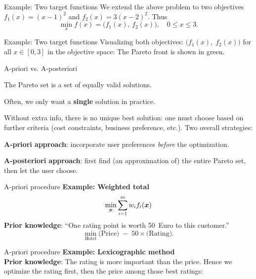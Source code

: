 \documentclass[11pt,compress,t,notes=noshow,xcolor=table]{beamer}
\begin{document}
\begin{framev}{Example: Two target functions}
We extend the above problem to two objectives
$f_1(x) = (x - 1)^2$
and
$f_2(x) = 3(x - 2)^2$. Thus
$$
\min_{x} f(x)
= \bigl(f_1(x),\, f_2(x)\bigr),
\quad 0 \le x \le 3.
$$
\end{framev}


\begin{framev}{Example: Two target functions}
Visualizing both objectives:
$\bigl(f_1(x), \;f_2(x)\bigr)$
for all $x \in [0,3]$ in the objective space:
The Pareto front is shown in green.
\end{framev}


\begin{framei}{A-priori vs. A-posteriori}
\item The Pareto set is a set of equally valid solutions.
\item Often, we only want a \textbf{single} solution in practice.
\item Without extra info, there is no unique best solution: one must choose
based on further criteria (cost constraints, business preference, etc.).
\spacer
Two overall strategies:
\item \textbf{A-priori approach}: incorporate user preferences \emph{before} the optimization.
\item \textbf{A-posteriori approach}: first find (an approximation of) the entire Pareto set,
then let the user choose.
\end{framei}


\begin{framev}{A-priori procedure}
\textbf{Example: Weighted total}
$$ \min_{\bm{x}} \sum_{i=1}^m w_i f_i(\bm{x}) $$
\textbf{Prior knowledge}:
``One rating point is worth 50~Euro to this customer.''
$$
\min_{\text{Hotel}} \text{(Price)} \;-\; 50 \times \text{(Rating)}.
$$
\spacer
{}
\end{framev}


\begin{framev}{A-priori procedure}
\textbf{Example: Lexicographic method}\\
\spacer
\textbf{Prior knowledge}: The rating is more important than the price.
Hence we optimize the rating first, then the price among those best ratings:
\end{framev}
\end{document}
